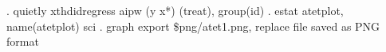 . quietly xthdidregress aipw (y x*) (treat), group(id) 
{\smallskip}
. estat atetplot, name(atetplot) sci
{\smallskip}
. graph export \$png/atet1.png, replace
file{} saved as PNG format
